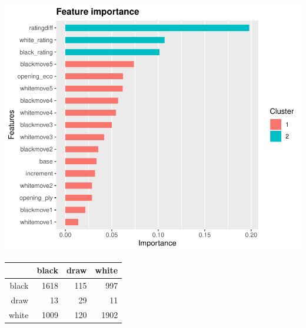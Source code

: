 \documentclass[11pt,preprint, authoryear]{elsarticle}
\let\origtable\table
\let\endorigtable\endtable
\renewenvironment{table}[1][2] {
    \expandafter\origtable\expandafter[H]
} {
    \endorigtable
}
\numberwithin{equation}{section}
\numberwithin{figure}{section}
\numberwithin{table}{section}
\begin{document}
\includegraphics{WriteUp_files/figure-latex/unnamed-chunk-4-1.pdf}

\begin{table}[ht]
\centering
\begin{tabular}{rrrr}
  \hline
 & black & draw & white \\ 
  \hline
black & 1618 & 115 & 997 \\ 
  draw &  13 &  29 &  11 \\ 
  white & 1009 & 120 & 1902 \\ 
   \hline
\end{tabular}
\end{table}


\end{document}
